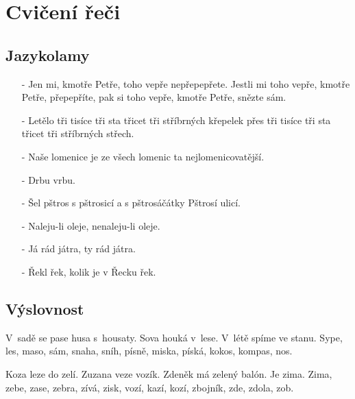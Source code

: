 
\section{Cvičení řeči}
\begin{multicols}{\value{columnsgames}}

\subsection{Jazykolamy}

\begin{itemize}
\itemsep -3pt

\item[-] Jen mi, kmotře Petře, toho vepře nepřepepřete. Jestli mi 
toho vepře, kmotře Petře, přepepříte, pak si toho vepře, kmotře 
Petře, snězte sám.

\item[-] Letělo tři tisíce tři sta třicet tři stříbrných křepelek přes 
tři tisíce tři sta třicet tři stříbrných střech.

\item[-] Naše lomenice je ze všech lomenic ta nejlomenicovatější.

\item[-] Drbu vrbu.

\item[-] Šel pštros s pštrosicí a s pštrosáčátky Pštrosí ulicí.

\item[-] Naleju-li oleje, nenaleju-li oleje.

\item[-] Já rád játra, ty rád játra.

\item[-] Řekl řek, kolik je v Řecku řek.

\end{itemize}

\subsection{Výslovnost}

\begin{description}
\itemsep 0pt

\item[S] V~sadě se pase husa s~housaty. Sova houká v~lese. 
V~létě spíme ve stanu. Sype, les, maso, sám, snaha, sníh,
písně, miska, píská, kokos, kompas, nos.

\item[Z] Koza leze do zelí. Zuzana veze vozík. Zdeněk má
zelený balón. Je zima. Zima, zebe, zase, zebra, zívá, zisk,
vozí, kazí, kozí, zbojník, zde, zdola, zob.


\end{description}
\end{multicols}
